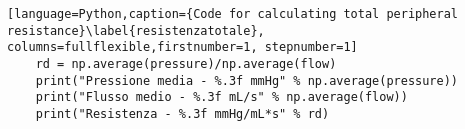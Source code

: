 \begin{lstlisting}[language=Python,caption={Code for calculating total peripheral resistance}\label{resistenzatotale}, columns=fullflexible,firstnumber=1, stepnumber=1]
    rd = np.average(pressure)/np.average(flow)
    print("Pressione media - %.3f mmHg" % np.average(pressure))
    print("Flusso medio - %.3f mL/s" % np.average(flow))
    print("Resistenza - %.3f mmHg/mL*s" % rd)
\end{lstlisting}